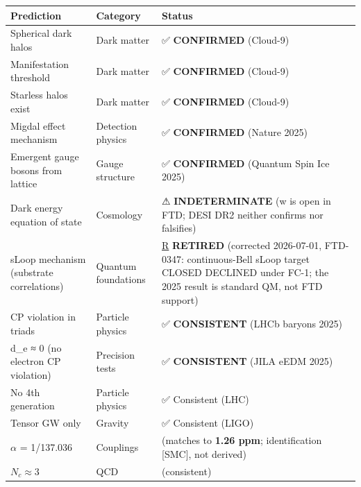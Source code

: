 \documentclass[
  11pt,
  letterpaper,
  twoside,
  openany]{book}
\begin{document}
\begin{longtable}[]{@{}
  >{\raggedright\arraybackslash}p{}
  >{\raggedright\arraybackslash}p{}
  >{\raggedright\arraybackslash}p{}@{}}
\toprule\noalign{}
\begin{minipage}[b]{\linewidth}\raggedright
Prediction
\end{minipage} & \begin{minipage}[b]{\linewidth}\raggedright
Category
\end{minipage} & \begin{minipage}[b]{\linewidth}\raggedright
Status
\end{minipage} \\
\midrule\noalign{}
\endhead
\bottomrule\noalign{}
\endlastfoot
Spherical dark halos & Dark matter & ✅ \textbf{CONFIRMED} (Cloud-9) \\
Manifestation threshold & Dark matter & ✅ \textbf{CONFIRMED}
(Cloud-9) \\
Starless halos exist & Dark matter & ✅ \textbf{CONFIRMED} (Cloud-9) \\
Migdal effect mechanism & Detection physics & ✅ \textbf{CONFIRMED}
(Nature 2025) \\
Emergent gauge bosons from lattice & Gauge structure & ✅
\textbf{CONFIRMED} (Quantum Spin Ice 2025) \\
Dark energy equation of state & Cosmology & ⚠ \textbf{INDETERMINATE} (w
is open in FTD; DESI DR2 neither confirms nor falsifies) \\
sLoop mechanism (substrate correlations) & Quantum foundations &
\hyperref[r]{R} \textbf{RETIRED} (corrected 2026-07-01, FTD-0347:
continuous-Bell sLoop target CLOSED DECLINED under FC-1; the 2025 result
is standard QM, not FTD support) \\
CP violation in triads & Particle physics & ✅ \textbf{CONSISTENT} (LHCb
baryons 2025) \\
d\_e ≈ 0 (no electron CP violation) & Precision tests & ✅
\textbf{CONSISTENT} (JILA eEDM 2025) \\
No 4th generation & Particle physics & ✅ Consistent (LHC) \\
Tensor GW only & Gravity & ✅ Consistent (LIGO) \\
\(\alpha\) = 1/137.036 & Couplings & (matches to \textbf{1.26 ppm};
identification {[}SMC{]}, not derived) \\
\(N_c \approx 3\) & QCD & (consistent) \\
\end{longtable}
\end{document}
